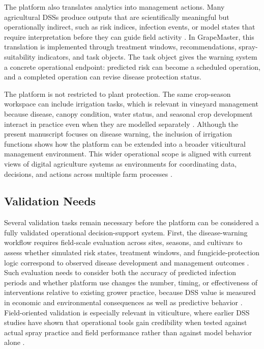 \documentclass[11pt,a4paper]{article}
\begin{document}
The platform also translates analytics into management actions. Many agricultural DSSs produce outputs that are scientifically meaningful but operationally indirect, such as risk indices, infection events, or model states that require interpretation before they can guide field activity \citep{Helps2024DSSValue,Walling2020EDSS}. In GrapeMaster, this translation is implemented through treatment windows, recommendations, spray-suitability indicators, and task objects. The task object gives the warning system a concrete operational endpoint: predicted risk can become a scheduled operation, and a completed operation can revise disease protection status.

The platform is not restricted to plant protection. The same crop-season workspace can include irrigation tasks, which is relevant in vineyard management because disease, canopy condition, water status, and seasonal crop development interact in practice even when they are modelled separately \citep{Kang2023IrrigationDSS,OrtegaFarias2019Phenology,Knowling2021ViticultureModels}. Although the present manuscript focuses on disease warning, the inclusion of irrigation functions shows how the platform can be extended into a broader viticultural management environment. This wider operational scope is aligned with current views of digital agriculture systems as environments for coordinating data, decisions, and actions across multiple farm processes \citep{Uyar2024DataValue,Tummers2021ReferenceArchitecture}.

\subsection{Validation Needs}

Several validation tasks remain necessary before the platform can be considered a fully validated operational decision-support system. First, the disease-warning workflow requires field-scale evaluation across sites, seasons, and cultivars to assess whether simulated risk states, treatment windows, and fungicide-protection logic correspond to observed disease development and management outcomes \citep{Puelles2024DownyMildewModels,Mian2021DownyMildewDSS,Helps2024DSSValue}. Such evaluation needs to consider both the accuracy of predicted infection periods and whether platform use changes the number, timing, or effectiveness of interventions relative to existing grower practice, because DSS value is measured in economic and environmental consequences as well as predictive behavior \citep{Helps2024DSSValue}. Field-oriented validation is especially relevant in viticulture, where earlier DSS studies have shown that operational tools gain credibility when tested against actual spray practice and field performance rather than against model behavior alone \citep{Gil2011Dosavina,Knowling2021ViticultureModels}.
\end{document}
